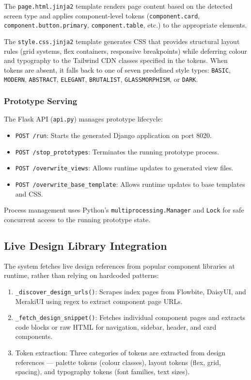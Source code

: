 The \texttt{page.html.jinja2} template renders page content based on the detected screen type and applies component-level tokens (\texttt{component.card}, \texttt{component.button.primary}, \texttt{component.table}, etc.) to the appropriate elements.

The \texttt{style.css.jinja2} template generates CSS that provides structural layout rules (grid systems, flex containers, responsive breakpoints) while deferring colour and typography to the Tailwind CDN classes specified in the tokens. When tokens are absent, it falls back to one of seven predefined style types: \texttt{BASIC}, \texttt{MODERN}, \texttt{ABSTRACT}, \texttt{ELEGANT}, \texttt{BRUTALIST}, \texttt{GLASSMORPHISM}, or \texttt{DARK}.


\subsubsection{Prototype Serving}

The Flask API (\texttt{api.py}) manages prototype lifecycle:
\begin{itemize}
    \item \texttt{POST /run}: Starts the generated Django application on port 8020.
    \item \texttt{POST /stop\_prototypes}: Terminates the running prototype process.
    \item \texttt{POST /overwrite\_views}: Allows runtime updates to generated view files.
    \item \texttt{POST /overwrite\_base\_template}: Allows runtime updates to base templates and CSS.
\end{itemize}

Process management uses Python's \texttt{multiprocessing.Manager} and \texttt{Lock} for safe concurrent access to the running prototype state.


\subsection{Live Design Library Integration}

The system fetches live design references from popular component libraries at runtime, rather than relying on hardcoded patterns:

\begin{enumerate}
    \item \texttt{\_discover\_design\_urls()}: Scrapes index pages from Flowbite, DaisyUI, and MerakiUI using regex to extract component page URLs.
    \item \texttt{\_fetch\_design\_snippet()}: Fetches individual component pages and extracts code blocks or raw HTML for navigation, sidebar, header, and card components.
    \item Token extraction: Three categories of tokens are extracted from design references — palette tokens (colour classes), layout tokens (flex, grid, spacing), and typography tokens (font families, text sizes).
\end{enumerate}

